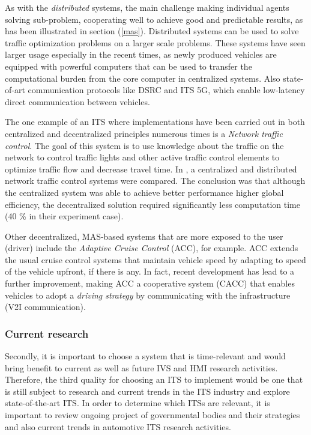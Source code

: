 \documentclass[main.tex]{subfiles}
\begin{document}
As with the \emph{distributed} systems, the main challenge making individual agents 
solving sub-problem, cooperating well to achieve good and predictable results, as has been 
illustrated in section (\ref{mas}). Distributed systems can be used to solve traffic optimization
problems on a larger scale problems. These systems have seen larger usage especially in the
recent times, as newly produced vehicles are equipped with powerful computers that can be used
to transfer the computational burden from the core computer in centralized systems. Also
state-of-art communication protocols like DSRC and ITS 5G, which enable low-latency direct
communication between vehicles. 

The one example of an ITS where implementations have been carried out in both centralized and 
decentralized principles numerous times is a \emph{Network traffic control}. The goal of this 
system is to use knowledge about the traffic on the network to control traffic lights and other 
active traffic control elements to optimize traffic flow and decrease travel time. In \cite{Chow2019}, 
a centralized and distributed network traffic control systems were compared. The conclusion was that 
although the centralized system was able to achieve better performance higher global efficiency, 
the decentralized solution required significantly less computation time (40 \% in their experiment case).

Other decentralized, MAS-based systems that are more exposed to the user (driver) include the 
\emph{Adaptive Cruise Control} (ACC), for example. ACC extends the usual cruise control systems 
that maintain vehicle speed by adapting to speed of the vehicle upfront, if there is any. In fact, 
recent development has lead to a further improvement, making ACC a cooperative system (CACC) that 
enables vehicles to adopt a \emph{driving strategy} by communicating with the infrastructure (V2I 
communication).

\subsubsection{Current research}

Secondly, it is important to choose a system that is time-relevant and would bring benefit to
current as well as future IVS and HMI research activities. Therefore, the third quality for choosing 
an ITS to implement would be one that is still subject to research and current trends in 
the ITS industry and explore state-of-the-art ITS. In order to determine which ITSs are relevant, 
it is important to review ongoing project of governmental bodies and their strategies and also
current trends in automotive ITS research activities.
\end{document}
